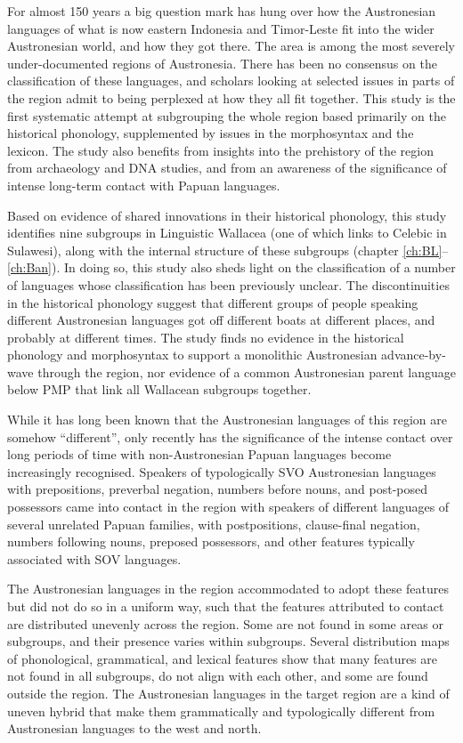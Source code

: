 \addchap{\lsPrefaceTitle}
For almost 150 years a big question mark has hung over how the Austronesian languages of what is now eastern Indonesia
and Timor-Leste fit into the wider Austronesian world,
and how they got there.
The area is among the most severely under-documented regions of Austronesia.
There has been no consensus on the classification of these languages,
and scholars looking at selected issues in parts of the region admit to being perplexed at how they all fit together.
This study is the first systematic attempt at subgrouping the whole region based primarily on the historical phonology,
supplemented by issues in the morphosyntax
and the lexicon.
The study also benefits from insights into the prehistory of the region from archaeology
and DNA studies,
and from an awareness of the significance of intense long-term contact with Papuan languages.

Based on evidence of shared innovations in their historical phonology,
this study identifies nine subgroups in Linguistic Wallacea (one of which links to Celebic in Sulawesi),
along with the internal structure of these subgroups (chapter \ref{ch:BL}--\ref{ch:Ban}).
In doing so,
this study also sheds light on the classification of a number of languages whose classification has been previously unclear.
The discontinuities in the historical phonology suggest that different groups
of people speaking different Austronesian languages got off different boats at different places,
and probably at different times.
The study finds no evidence in the historical phonology
and morphosyntax to support a monolithic Austronesian advance-by-wave through the region,
nor evidence of a common Austronesian parent language below PMP that link all Wallacean subgroups together.

While it has long been known that the Austronesian languages of this region are somehow “different”,
only recently has the significance of the intense contact over long periods
of time with non-Austronesian Papuan languages become increasingly recognised.
Speakers of typologically SVO Austronesian languages with prepositions,
preverbal negation, numbers before nouns,
and post-posed possessors came into contact in the region with speakers
of different languages of several unrelated Papuan families,
with postpositions, clause-final negation,
numbers following nouns,
preposed possessors, and other features typically associated with SOV languages.

The Austronesian languages in the region accommodated to adopt these features but did not do so in a uniform way,
such that the features attributed to contact are distributed unevenly across the region.
Some are not found in some areas or subgroups,
and their presence varies within subgroups.
Several distribution maps of phonological,
grammatical, and lexical features show that many features are not found in all subgroups,
do not align with each other,
and some are found outside the region.
The Austronesian languages in the target region are a kind of uneven hybrid that make them grammatically
and typologically different from Austronesian languages to the west
and north.

